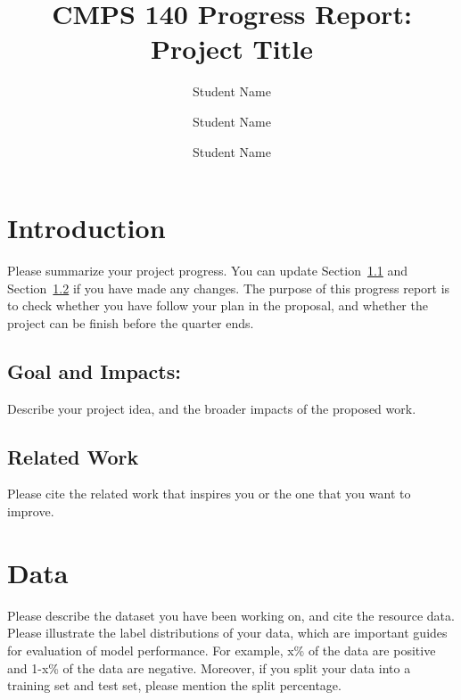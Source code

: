\documentclass[runningheads]{llncs}
\begin{document}
%
\title{CMPS 140 Progress Report: Project Title}
%
%
\author{Student Name \and Student Name \and Student Name }
%
%
%
\maketitle              %
%
%
%
%
\section{Introduction}

Please summarize your project progress. You can update Section~\ref{sec:goal} and Section~\ref{sec:related_work} if you have made any changes. The purpose of this progress report is to check whether you have follow your plan in the proposal, and whether the project can be finish before the quarter ends.

\subsection{Goal and Impacts:}
\label{sec:goal}
Describe your project idea, and the broader impacts of the proposed work.

\subsection{Related Work}
\label{sec:related_work}
Please cite the related work that inspires you or the one that you want to improve.

\section{Data}
Please describe the dataset you have been working on, and cite the resource data. Please illustrate the label distributions of your data, which are important guides for evaluation of model performance. For example, x\% of the data are positive and 1-x\% of the data are negative. Moreover, if you split your data into a training set and test set, please mention the split percentage. 
\end{document}

